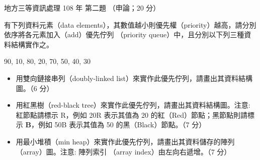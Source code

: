 \begin{pastexam}[label={px:df3-108-ds-02}]{地方三等資訊處理 108 年 第二題}
（申論；20 分）

有下列資料元素（data elements），其數值越小則優先權（priority）越高，請分別依序將各元素加入（add）優先佇列
（priority queue）中，且分別以下列三種資料結構實作之。
\begin{center}
90, 10, 80, 20, 70, 50, 40, 30
\end{center}
\begin{itemize}[leftmargin=2.2em]
\item[㈠] 用雙向鏈接串列（doubly-linked list）來實作此優先佇列，請畫出其資料結構圖。（6 分）
\item[㈡] 用紅黑樹（red-black tree）來實作此優先佇列，請畫出其資料結構圖。注意: 紅節點請標示 R，例如 20R
表示其值為 20 的紅（Red）節點；黑節點則請標示 \textbf{B}，例如 50B 表示其值為 50 的黑（Black）節點。（7 分）
\item[㈢] 用最小堆積（min heap）來實作此優先佇列，請畫出其資料儲存的陣列（array）圖。注意: 陣列索引
（array index）由左向右遞增。（7 分）
\end{itemize}
\end{pastexam}

